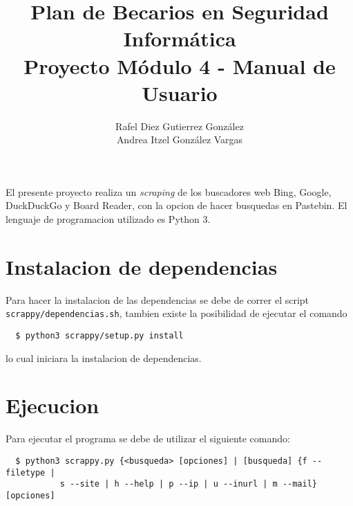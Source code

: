 \documentclass[12pt]{article}
\title{Plan de Becarios en Seguridad Informática\\Proyecto Módulo 4 - Manual de Usuario}
\author{Rafel Diez Gutierrez González\\Andrea Itzel González Vargas}
\begin{document}
\maketitle

El presente proyecto realiza un \textit{scraping} de los buscadores web Bing, Google, DuckDuckGo y Board Reader, con la opcion de hacer busquedas en Pastebin. El lenguaje de programacion utilizado es \textsf{Python 3}.

\section{Instalacion de dependencias}
Para hacer la instalacion de las dependencias se debe de correr el script \texttt{scrappy/dependencias.sh}, tambien existe la posibilidad de ejecutar el comando
\begin{verbatim}
  $ python3 scrappy/setup.py install
\end{verbatim}
lo cual iniciara la instalacion de dependencias.

\section{Ejecucion}
Para ejecutar el programa se debe de utilizar el siguiente comando:

\begin{verbatim}
  $ python3 scrappy.py {<busqueda> [opciones] | [busqueda] {f --filetype | 
           s --site | h --help | p --ip | u --inurl | m --mail} [opciones]
\end{verbatim}
\end{document}
